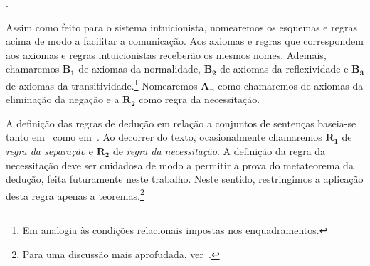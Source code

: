     . 

    Assim como feito para o sistema intuicionista, nomearemos os esquemas e regras acima de modo a facilitar a comunicação.
    Aos axiomas e regras que correspondem aos axiomas e regras intuicionistas receberão os mesmos nomes. Ademais, chamaremos $\mathbf{B_1}$ de axiomas da normalidade, $\mathbf{B_2}$ de axiomas da reflexividade e $\mathbf{B_3}$ de axiomas da transitividade.\footnote{Em analogia às condições relacionais impostas nos enquadramentos.} Nomearemos $\mathbf{A_\neg}$ como chamaremos de axiomas da eliminação da negação e a $\mathbf{R_2}$ como regra da necessitação.

    A definição das regras de dedução em relação a conjuntos de sentenças baseia-se tanto em~\cite{Troelstra} como em~\cite{Hakli}. Ao decorrer do texto, ocasionalmente chamaremos $\mathbf{R_1}$ de \emph{regra da separação} e $\mathbf{R_2}$ de \emph{regra da necessitação}. A definição da regra da necessitação deve ser cuidadosa de modo a permitir a prova do metateorema da dedução, feita futuramente neste trabalho. Neste sentido, restringimos a aplicação desta regra apenas a teoremas.\footnote{Para uma discussão mais aprofudada, ver~\cite{Hakli}.}
